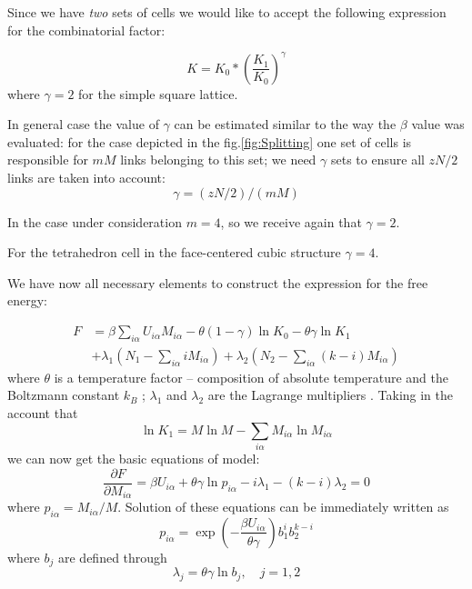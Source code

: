 \documentclass[12pt,abstract]{scrartcl}
\begin{document}
Since we have \textit{two} sets of cells we would like to accept  the following expression for the combinatorial factor: 

\begin{equation} \label{config_final}
K =K_0 * \left( \frac{K_1}{K_0} \right)^\gamma 
\end{equation}
where $\gamma=2$ for the simple square lattice.

In general case the value of $\gamma$ can be estimated similar to the way the $\beta$ value was evaluated: for the case depicted in the fig.\ref{fig:Splitting} one set of cells is responsible for $m M$ links belonging to this set; we need $\gamma$ sets to ensure all $z N/2$ links are taken into account:
\begin{equation} \label{gamma}
\gamma = (z N/2) / (m M)
\end{equation}

In the case under consideration $m = 4$, so we receive again that   $\gamma = 2$.


For the tetrahedron cell in the face-centered cubic  structure $\gamma=4$. 


We have now all necessary elements to construct the expression for the free energy:

\begin{equation} \label{free_energy}
\begin{split}
    F &= \beta\sum_{i\alpha} U_{i \alpha} M_{i \alpha} - \theta(1- \gamma) \ln K_0 - \theta \gamma \ln K_1\\ &+ \lambda_1 \left(N_1 - \sum_{i\alpha} i M_{i \alpha} 
    \right) + \lambda_2 \left(N_2 - \sum_{i\alpha} (k-i) M_{i \alpha} 
    \right)
\end{split}
\end{equation}
where $\theta $ is a temperature factor --  composition of absolute temperature and the Boltzmann constant $k_B$  \cite{Hill1956}; $\lambda_1$ and  $\lambda_2$ are the Lagrange multipliers  \cite{Arfken2013}.
Taking in the account that
\[
\ln K_1 = M \ln{M} - \sum_{i \alpha}M_{i\alpha} \ln{M_{i\alpha}}
\]
we can now get the basic equations of model:
\begin{equation} \label{basic_equation}
    \frac{\partial F}{\partial M_{i\alpha}} = \beta U_{i \alpha} + \theta \gamma \ln p_{i \alpha} - i \lambda_1 - (k-i) \lambda_2 = 0 
\end{equation}
where $ p_{i\alpha} =  M_{i\alpha} / M$.
Solution of these equations can be immediately written as
\begin{equation} \label{pia}
    p_{i\alpha} = \exp \left(- {\frac{\beta U_{i \alpha}}{\theta\gamma }}\right) b_1^i b_2^{k-i}
\end{equation}
where $b_j$ are defined through
\begin{equation}
    \lambda_j = \theta \gamma \ln b_j, \quad  j = 1, 2
\end{equation}
\end{document}
